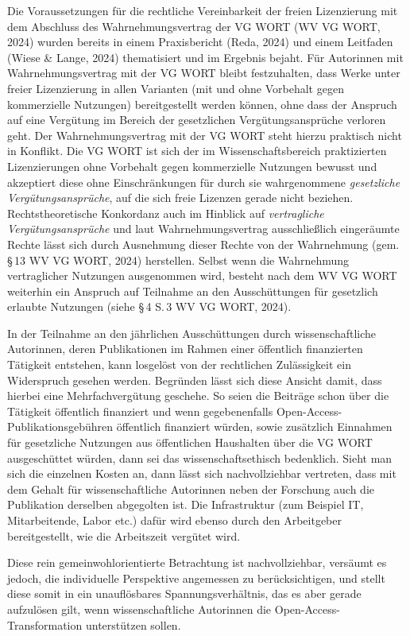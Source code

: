 \documentclass[a4paper,
fontsize=11pt,
oneside,
numbers=noperiodatend,
parskip=half-,
bibliography=totoc,
final
]{scrartcl}
\begin{document}
Die Voraussetzungen für die rechtliche Vereinbarkeit der freien
Lizenzierung mit dem Abschluss des Wahrnehmungsvertrag der VG WORT (WV
VG WORT, 2024) wurden bereits in einem Praxisbericht (Reda, 2024) und
einem Leitfaden (Wiese \& Lange, 2024) thematisiert und im Ergebnis
bejaht. Für Autorinnen mit Wahrnehmungsvertrag mit der VG WORT bleibt
festzuhalten, dass Werke unter freier Lizenzierung in allen Varianten
(mit und ohne Vorbehalt gegen kommerzielle Nutzungen) bereitgestellt
werden können, ohne dass der Anspruch auf eine Vergütung im Bereich der
gesetzlichen Vergütungsansprüche verloren geht. Der Wahrnehmungsvertrag
mit der VG WORT steht hierzu praktisch nicht in Konflikt. Die VG WORT
ist sich der im Wissenschaftsbereich praktizierten Lizenzierungen ohne
Vorbehalt gegen kommerzielle Nutzungen bewusst und akzeptiert diese ohne
Einschränkungen für durch sie wahrgenommene \emph{gesetzliche
Vergütungsansprüche}, auf die sich freie Lizenzen gerade nicht beziehen.
Rechtstheoretische Konkordanz auch im Hinblick auf \emph{vertragliche
Vergütungsansprüche} und laut Wahrnehmungsvertrag ausschließlich
eingeräumte Rechte lässt sich durch Ausnehmung dieser Rechte von der
Wahrnehmung (gem. §\,13 WV VG WORT, 2024) herstellen. Selbst wenn die
Wahrnehmung vertraglicher Nutzungen ausgenommen wird, besteht nach dem
WV VG WORT weiterhin ein Anspruch auf Teilnahme an den Ausschüttungen
für gesetzlich erlaubte Nutzungen (siehe §\,4 S.\,3 WV VG WORT, 2024).

In der Teilnahme an den jährlichen Ausschüttungen durch
wissenschaftliche Autorinnen, deren Publikationen im Rahmen einer
öffentlich finanzierten Tätigkeit entstehen, kann losgelöst von der
rechtlichen Zulässigkeit ein Widerspruch gesehen werden. Begründen lässt
sich diese Ansicht damit, dass hierbei eine Mehrfachvergütung geschehe.
So seien die Beiträge schon über die Tätigkeit öffentlich finanziert und
wenn gegebenenfalls Open-Access-Publikationsgebühren öffentlich
finanziert würden, sowie zusätzlich Einnahmen für gesetzliche Nutzungen
aus öffentlichen Haushalten über die VG WORT ausgeschüttet würden, dann
sei das wissenschaftsethisch bedenklich. Sieht man sich die einzelnen
Kosten an, dann lässt sich nachvollziehbar vertreten, dass mit dem
Gehalt für wissenschaftliche Autorinnen neben der Forschung auch die
Publikation derselben abgegolten ist. Die Infrastruktur (zum Beispiel
IT, Mitarbeitende, Labor etc.) dafür wird ebenso durch den Arbeitgeber
bereitgestellt, wie die Arbeitszeit vergütet wird.

Diese rein gemeinwohlorientierte Betrachtung ist nachvollziehbar,
versäumt es jedoch, die individuelle Perspektive angemessen zu
berücksichtigen, und stellt diese somit in ein unauflösbares
Spannungsverhältnis, das es aber gerade aufzulösen gilt, wenn
wissenschaftliche Autorinnen die Open-Access-Transformation unterstützen
sollen.
\end{document}
